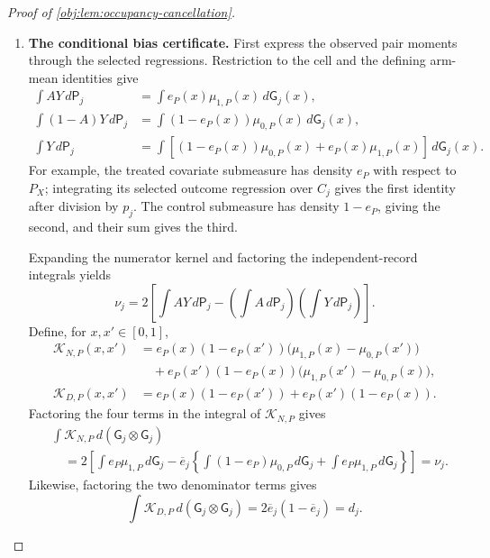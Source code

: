 \begin{proof}[Proof of \cref{obj:lem:occupancy-cancellation}]
\begin{enumerate}
\item \textbf{The conditional bias certificate.}
First express the observed pair moments through the selected regressions. Restriction to the cell and the defining arm-mean identities give
\[
\begin{aligned}
\int AY\,d\mathsf P_j
&=\int e_P(x)\mu_{1,P}(x)\,d\mathsf G_j(x),\\
\int (1-A)Y\,d\mathsf P_j
&=\int (1-e_P(x))\mu_{0,P}(x)\,d\mathsf G_j(x),\\
\int Y\,d\mathsf P_j
&=\int\left[(1-e_P(x))\mu_{0,P}(x)
             +e_P(x)\mu_{1,P}(x)\right]\,d\mathsf G_j(x).
\end{aligned}
\]
For example, the treated covariate submeasure has density \(e_P\) with respect to \(P_X\); integrating its selected outcome regression over \(C_j\) gives the first identity after division by \(p_j\). The control submeasure has density \(1-e_P\), giving the second, and their sum gives the third.

Expanding the numerator kernel and factoring the independent-record integrals yields
\[
\nu_j
=
2\left[
\int AY\,d\mathsf P_j
-\left(\int A\,d\mathsf P_j\right)
 \left(\int Y\,d\mathsf P_j\right)
\right].
\]
Define, for \(x,x'\in[0,1]\),
\[
\begin{aligned}
\mathcal K_{N,P}(x,x')
&=
e_P(x)(1-e_P(x'))
 \bigl(\mu_{1,P}(x)-\mu_{0,P}(x')\bigr)\\
&\quad+
e_P(x')(1-e_P(x))
 \bigl(\mu_{1,P}(x')-\mu_{0,P}(x)\bigr),\\
\mathcal K_{D,P}(x,x')
&=
e_P(x)(1-e_P(x'))
+e_P(x')(1-e_P(x)).
\end{aligned}
\]
Factoring the four terms in the integral of \(\mathcal K_{N,P}\) gives
\[
\begin{aligned}
&\int\mathcal K_{N,P}\,d(\mathsf G_j\otimes\mathsf G_j)\\
&\quad=
2\left[
\int e_P\mu_{1,P}\,d\mathsf G_j
-\overline e_j
 \left\{
 \int(1-e_P)\mu_{0,P}\,d\mathsf G_j
 +\int e_P\mu_{1,P}\,d\mathsf G_j
 \right\}
\right]
=\nu_j.
\end{aligned}
\]
Likewise, factoring the two denominator terms gives
\[
\int\mathcal K_{D,P}\,d(\mathsf G_j\otimes\mathsf G_j)
=2\overline e_j(1-\overline e_j)=d_j.
\]


\end{enumerate}
\end{proof}

